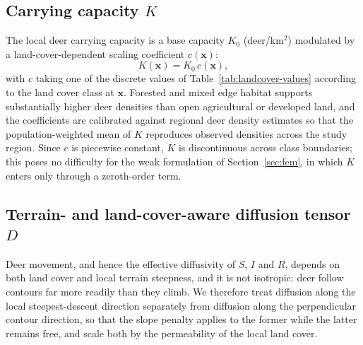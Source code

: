 \documentclass[11pt]{article}
\begin{document}
\subsection{Carrying capacity \texorpdfstring{$K$}{K}}
\label{sec:carrying}

The local deer carrying capacity is a base capacity $K_0$ (deer/km$^2$) modulated by a land-cover-dependent scaling coefficient $c(\mathbf{x})$:
\begin{equation}
  K(\mathbf{x}) = K_0\, c(\mathbf{x}),
  \label{eq:K}
\end{equation}
with $c$ taking one of the discrete values of Table~\ref{tab:landcover-values} according to the land cover class at $\mathbf{x}$. Forested and mixed edge habitat supports substantially higher deer densities than open agricultural or developed land, and the coefficients are calibrated against regional deer density estimates so that the population-weighted mean of $K$ reproduces observed densities across the study region. Since $c$ is piecewise constant, $K$ is discontinuous across class boundaries; this poses no difficulty for the weak formulation of Section~\ref{sec:fem}, in which $K$ enters only through a zeroth-order term.

\subsection{Terrain- and land-cover-aware diffusion tensor \texorpdfstring{$D$}{D}}
\label{sec:diffusion}

Deer movement, and hence the effective diffusivity of $S$, $I$ and $R$, depends on both land cover and local terrain steepness, and it is not isotropic: deer follow contours far more readily than they climb. We therefore treat diffusion along the local steepest-descent direction separately from diffusion along the perpendicular contour direction, so that the slope penalty applies to the former while the latter remains free, and scale both by the permeability of the local land cover.
\end{document}
